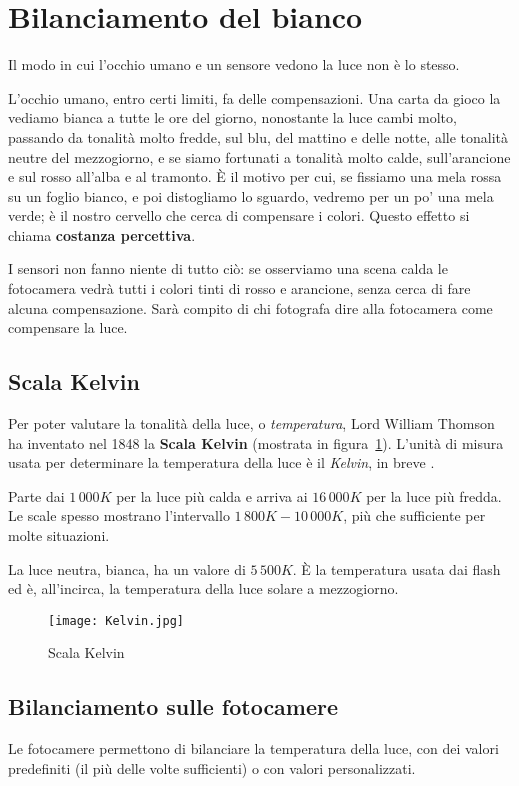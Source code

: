 \section{Bilanciamento del bianco} \label{sec:whitebalance}
Il modo in cui l'occhio umano e un sensore vedono la luce non è lo stesso.

L'occhio umano, entro certi limiti, fa delle compensazioni. Una carta da gioco la vediamo bianca a tutte le ore del giorno, nonostante la luce cambi molto, passando da tonalità molto fredde, sul blu, del mattino e delle notte, alle tonalità neutre del mezzogiorno, e se siamo fortunati a tonalità molto calde, sull'arancione e sul rosso all'alba e al tramonto.
È il motivo per cui, se fissiamo una mela rossa su un foglio bianco, e poi distogliamo lo sguardo, vedremo per un po' una mela verde; è il nostro cervello che cerca di compensare i colori.
Questo effetto si chiama \textbf{costanza percettiva}.

I sensori non fanno niente di tutto ciò: se osserviamo una scena calda le fotocamera vedrà tutti i colori tinti di rosso e arancione, senza cerca di fare alcuna compensazione.
Sarà compito di chi fotografa dire alla fotocamera come compensare la luce.

\subsection{Scala Kelvin} \label{subsec:scalakelvin}
Per poter valutare la tonalità della luce, o \textit{temperatura}, Lord William Thomson ha inventato nel 1848 la \textbf{Scala Kelvin} (mostrata in figura~\ref{fig:scala_kelvin}).
L'unità di misura usata per determinare la temperatura della luce è il \textit{Kelvin}, in breve .

Parte dai $1\,000K$ per la luce più calda e arriva ai $16\,000K$ per la luce più fredda. Le scale spesso mostrano l'intervallo $1\,800K - 10\,000K$, più che sufficiente per molte situazioni.

La luce neutra, bianca, ha un valore di $5\,500K$. È la temperatura usata dai flash ed è, all'incirca, la temperatura della luce solare a mezzogiorno.

\begin{figure}[h]
    \centering
    \texttt{[image: Kelvin.jpg]}
    \caption{Scala Kelvin}
    \label{fig:scala_kelvin}
\end{figure}


\subsection{Bilanciamento sulle fotocamere} \label{subsec:bilaciamentofotocamere}
Le fotocamere permettono di bilanciare la temperatura della luce, con dei valori predefiniti (il più delle volte sufficienti) o con valori personalizzati.


